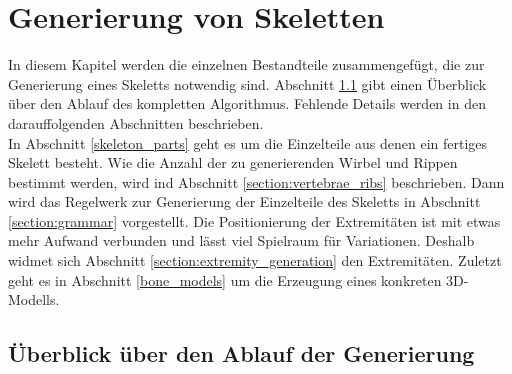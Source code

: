 \chapter{Generierung von Skeletten}
\label{chapter:skeleton_generation}

In diesem Kapitel werden die einzelnen Bestandteile zusammengefügt, die zur Generierung eines Skeletts notwendig sind. 
Abschnitt \ref{section:overview} gibt einen Überblick über den Ablauf des kompletten Algorithmus. Fehlende Details werden in den darauffolgenden Abschnitten beschrieben.\\
In Abschnitt \ref{skeleton_parts} geht es um die Einzelteile aus denen ein fertiges Skelett besteht. 
Wie die Anzahl der zu generierenden Wirbel und Rippen bestimmt werden, wird ind Abschnitt \ref{section:vertebrae_ribs} beschrieben.
Dann wird das Regelwerk zur Generierung der Einzelteile des Skeletts in Abschnitt \ref{section:grammar} vorgestellt. Die Positionierung der Extremitäten ist mit etwas mehr Aufwand verbunden und lässt viel Spielraum für Variationen. Deshalb widmet sich Abschnitt \ref{section:extremity_generation} den Extremitäten. 
Zuletzt geht es in Abschnitt \ref{bone_models} um die Erzeugung eines konkreten 3D-Modells.


\section{Überblick über den Ablauf der Generierung}
\label{section:overview}

